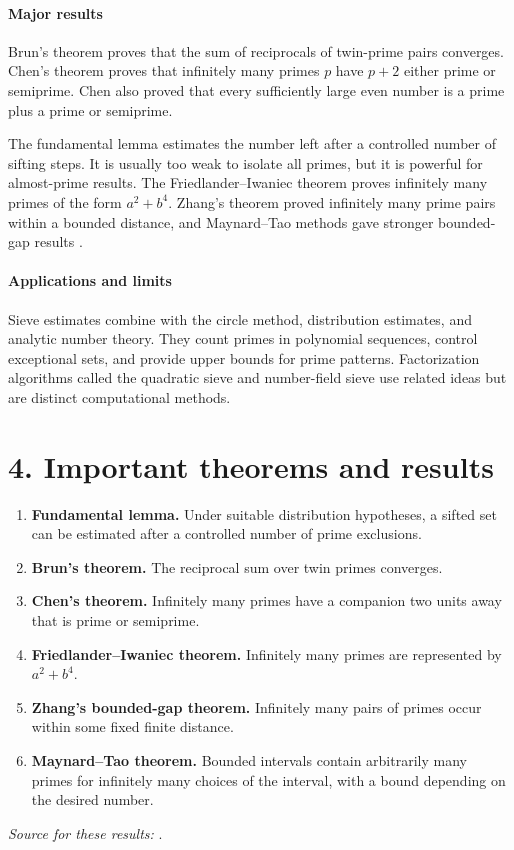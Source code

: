 \paragraph{Major results}
Brun's theorem proves that the sum of reciprocals of twin-prime pairs converges. Chen's theorem proves that infinitely many primes $p$ have $p+2$ either prime or semiprime. Chen also proved that every sufficiently large even number is a prime plus a prime or semiprime.

The fundamental lemma estimates the number left after a controlled number of sifting steps. It is usually too weak to isolate all primes, but it is powerful for almost-prime results. The Friedlander--Iwaniec theorem proves infinitely many primes of the form $a^2+b^4$. Zhang's theorem proved infinitely many prime pairs within a bounded distance, and Maynard--Tao methods gave stronger bounded-gap results \cite{sieve_ref3,sieve_ref4}.

\paragraph{Applications and limits}
Sieve estimates combine with the circle method, distribution estimates, and analytic number theory. They count primes in polynomial sequences, control exceptional sets, and provide upper bounds for prime patterns. Factorization algorithms called the quadratic sieve and number-field sieve use related ideas but are distinct computational methods.

\section*{4. Important theorems and results}
\begin{enumerate}[leftmargin=*,itemsep=0.35em]
\item \textbf{Fundamental lemma.} Under suitable distribution hypotheses, a sifted set can be estimated after a controlled number of prime exclusions.

\item \textbf{Brun's theorem.} The reciprocal sum over twin primes converges.

\item \textbf{Chen's theorem.} Infinitely many primes have a companion two units away that is prime or semiprime.

\item \textbf{Friedlander--Iwaniec theorem.} Infinitely many primes are represented by $a^2+b^4$.

\item \textbf{Zhang's bounded-gap theorem.} Infinitely many pairs of primes occur within some fixed finite distance.

\item \textbf{Maynard--Tao theorem.} Bounded intervals contain arbitrarily many primes for infinitely many choices of the interval, with a bound depending on the desired number.
\end{enumerate}
\noindent\emph{Source for these results:} \cite{sieve_ref1}.

